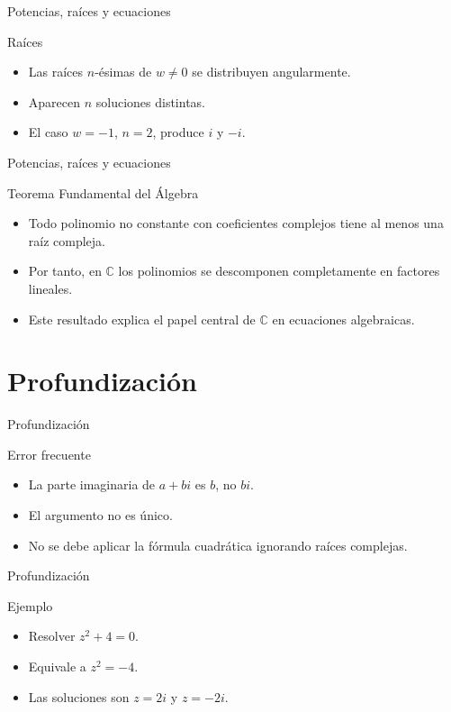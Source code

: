 \documentclass[aspectratio=169,11pt]{beamer}
\begin{document}
\begin{frame}{Potencias, raíces y ecuaciones}
\begin{block}{Raíces}
\begin{itemize}
  \item Las raíces \(n\)-ésimas de \(w\neq 0\) se distribuyen angularmente.
  \item Aparecen \(n\) soluciones distintas.
  \item El caso \(w=-1\), \(n=2\), produce \(i\) y \(-i\).
\end{itemize}
\end{block}
\end{frame}

\begin{frame}{Potencias, raíces y ecuaciones}
\begin{block}{Teorema Fundamental del Álgebra}
\begin{itemize}
  \item Todo polinomio no constante con coeficientes complejos tiene al menos una raíz compleja.
  \item Por tanto, en \(\mathbb{C}\) los polinomios se descomponen completamente en factores lineales.
  \item Este resultado explica el papel central de \(\mathbb{C}\) en ecuaciones algebraicas.
\end{itemize}
\end{block}
\end{frame}

\section{Profundización}

\begin{frame}{Profundización}
\begin{block}{Error frecuente}
\begin{itemize}
  \item La parte imaginaria de \(a+bi\) es \(b\), no \(bi\).
  \item El argumento no es único.
  \item No se debe aplicar la fórmula cuadrática ignorando raíces complejas.
\end{itemize}
\end{block}
\end{frame}

\begin{frame}{Profundización}
\begin{block}{Ejemplo}
\begin{itemize}
  \item Resolver \(z^2+4=0\).
  \item Equivale a \(z^2=-4\).
  \item Las soluciones son \(z=2i\) y \(z=-2i\).
\end{itemize}
\end{block}
\end{frame}
\end{document}
